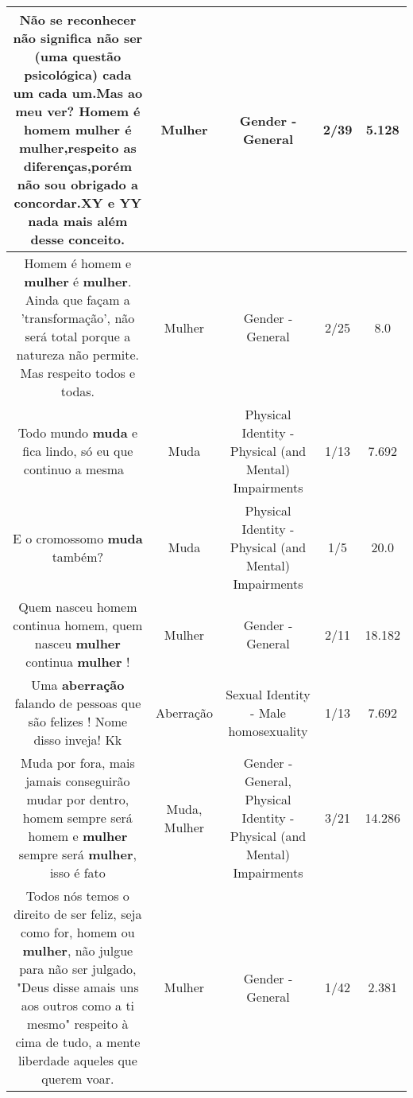 \documentclass[11pt]{article}
\newlength\mylength
\begin{document}
\begin{center}
\begin{longtable}{|C{.65\mylength}|C{.30\mylength}|C{.12\mylength}|C{.12\mylength}|C{.12\mylength}|}
  \small Não se reconhecer não significa não ser (uma questão psicológica) cada um cada um.Mas ao meu ver? Homem é homem \textbf{mulher} é \textbf{mulher},respeito as diferenças,porém não sou obrigado a concordar.XY e YY nada mais além desse conceito.\normalsize   & Mulher & Gender - General & 2/39 & 5.128 \\  \hline
  \small Homem é homem e \textbf{mulher} é \textbf{mulher}.  Ainda que façam a 'transformação', não será total porque a natureza não permite. Mas respeito todos e todas.\normalsize   & Mulher & Gender - General & 2/25 & 8.0 \\  \hline
  \small Todo mundo \textbf{muda} e fica lindo, só eu que continuo a mesma 💩\normalsize   & Muda & Physical Identity - Physical (and Mental) Impairments & 1/13 & 7.692 \\  \hline
  \small E o cromossomo \textbf{muda} também?\normalsize   & Muda & Physical Identity - Physical (and Mental) Impairments & 1/5 & 20.0 \\  \hline
  \small Quem nasceu homem continua homem, quem nasceu \textbf{mulher} continua \textbf{mulher} !\normalsize   & Mulher & Gender - General & 2/11 & 18.182 \\  \hline
  \small Uma \textbf{aberração} falando de pessoas que são felizes ! Nome disso inveja! Kk\normalsize   & Aberração & Sexual Identity - Male homosexuality & 1/13 & 7.692 \\  \hline
  \small Muda por fora, mais jamais conseguirão mudar por dentro, homem sempre será homem e \textbf{mulher} sempre será \textbf{mulher}, isso é fato\normalsize   & Muda, Mulher & Gender - General, Physical Identity - Physical (and Mental) Impairments & 3/21 & 14.286 \\  \hline
  \small Todos nós temos o direito de ser feliz, seja como for,  homem ou \textbf{mulher}, não julgue para não ser julgado, "Deus disse amais uns aos outros como a ti mesmo" respeito à cima de tudo, a mente liberdade aqueles que querem voar.\normalsize   & Mulher & Gender - General & 1/42 & 2.381 \\  \hline

\end{longtable}
\end{center}
\end{document}
